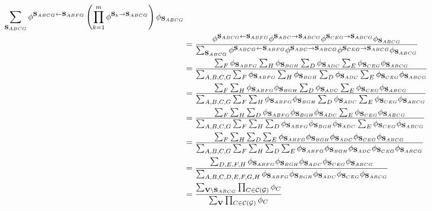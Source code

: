 \documentclass[11pt]{article}
\renewcommand{\vec}[1]{\mathbf{#1}}
\begin{document}
\begin{answertext}{23cm}{}
\begin{align*}
{}{
\sum_{\vec{S}_{ABCG}} \phi^{\vec{S}_{ABCG} \gets \vec{S}_{ABFG}}
\left( \prod_{k=1}^m \phi^{\vec{S}_k \to \vec{S}_{ABCG}} \right) \phi_{\vec{S}_{ABCG}}
}\\
&=
\frac{
\phi^{\vec{S}_{ABCG} \gets \vec{S}_{ABFG}}
 \phi^{\vec{S}_{ABC} \to \vec{S}_{ABCG}}   \phi^{\vec{S}_{CEG} \to \vec{S}_{ABCG}}\phi_{\vec{S}_{ABCG}}
}{
\sum_{\vec{S}_{ABCG}} \phi^{\vec{S}_{ABCG} \gets \vec{S}_{ABFG}}
 \phi^{\vec{S}_{ABC} \to \vec{S}_{ABCG}}   \phi^{\vec{S}_{CEG} \to \vec{S}_{ABCG}}\phi_{\vec{S}_{ABCG}}
}\\
&= \frac{\sum_{F} \phi_{\vec{S}_{ABFG}} \sum_{H} \phi_{\vec{S}_{BGH}}\sum_{D}\phi_{\vec{S}_{ADC}}\sum_{E}\phi_{\vec{S}_{CEG}}\phi_{\vec{S}_{ABCG}}}
{\sum_{A,B,C,G}\sum_{F} \phi_{\vec{S}_{ABFG}} \sum_{H} \phi_{\vec{S}_{BGH}}\sum_{D}\phi_{\vec{S}_{ADC}}\sum_{E}\phi_{\vec{S}_{CEG}}\phi_{\vec{S}_{ABCG}}}\\
&= \frac{\sum_{F} \sum_{H} \phi_{\vec{S}_{ABFG}} \phi_{\vec{S}_{BGH}}\sum_{D}\phi_{\vec{S}_{ADC}}\sum_{E}\phi_{\vec{S}_{CEG}}\phi_{\vec{S}_{ABCG}}}
{\sum_{A,B,C,G}\sum_{F}\sum_{H} \phi_{\vec{S}_{ABFG}}  \phi_{\vec{S}_{BGH}}\sum_{D}\phi_{\vec{S}_{ADC}}\sum_{E}\phi_{\vec{S}_{CEG}}\phi_{\vec{S}_{ABCG}}}\\
&= \frac{\sum_{F} \sum_{H}\sum_{D}\phi_{\vec{S}_{ABFG}}  \phi_{\vec{S}_{BGH}}\phi_{\vec{S}_{ADC}}\sum_{E}\phi_{\vec{S}_{CEG}}\phi_{\vec{S}_{ABCG}}}
{\sum_{A,B,C,G}\sum_{F}\sum_{H} \sum_{D} \phi_{\vec{S}_{ABFG}} \phi_{\vec{S}_{BGH}}\phi_{\vec{S}_{ADC}}\sum_{E}\phi_{\vec{S}_{CEG}}\phi_{\vec{S}_{ABCG}}}\\
&= \frac{\sum_{F} \sum_{H}\sum_{D} \sum_{E}\phi_{\vec{S}_{ABFG}} \phi_{\vec{S}_{BGH}}\phi_{\vec{S}_{ADC}}\phi_{\vec{S}_{CEG}}\phi_{\vec{S}_{ABCG}}}
{\sum_{A,B,C,G}\sum_{F}\sum_{H}\sum_{D} \sum_{E} \phi_{\vec{S}_{ABFG}} \phi_{\vec{S}_{BGH}}\phi_{\vec{S}_{ADC}}\phi_{\vec{S}_{CEG}}\phi_{\vec{S}_{ABCG}}}\\
&= \frac{\sum_{D,E,F,H} \phi_{\vec{S}_{ABFG}}\phi_{\vec{S}_{BGH}}\phi_{\vec{S}_{ADC}}\phi_{\vec{S}_{CEG}}\phi_{\vec{S}_{ABCG}}}
{\sum_{A,B,C,D,E,F,G,H} \phi_{\vec{S}_{ABFG}} \phi_{\vec{S}_{BGH}}\phi_{\vec{S}_{ADC}}\phi_{\vec{S}_{CEG}}\phi_{\vec{S}_{ABCG}}}\\
&=
\frac{
\sum_{\vec{V} \setminus \vec{S}_{ABCG}} \prod_{C \in {\cal C}({\cal G})} \phi_C
}{
\sum_{\vec{V}} \prod_{C \in {\cal C}({\cal G})} \phi_C
}
\end{align*}
\end{answertext}
\end{document}
